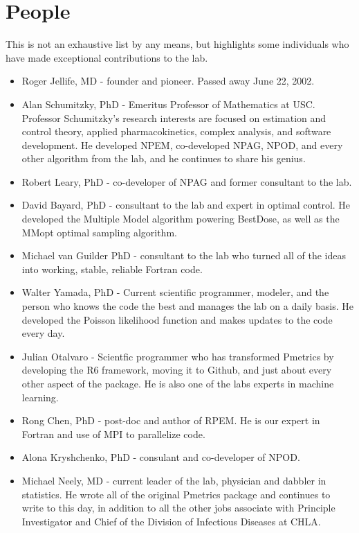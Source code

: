 \documentclass[
]{book}
\providecommand{\tightlist}{%
  \setlength{\itemsep}{0pt}\setlength{\parskip}{0pt}}
\begin{document}
\hypertarget{people}{%
\section{People}\label{people}}

This is not an exhaustive list by any means, but highlights some individuals who have made exceptional contributions to the lab.

\begin{itemize}
\tightlist
\item
  Roger Jellife, MD - founder and pioneer. Passed away June 22, 2002.
\item
  Alan Schumitzky, PhD - Emeritus Professor of Mathematics at USC. Professor Schumitzky's research interests are focused on estimation and control theory, applied pharmacokinetics, complex analysis, and software development. He developed NPEM, co-developed NPAG, NPOD, and every other algorithm from the lab, and he continues to share his genius.
\item
  Robert Leary, PhD - co-developer of NPAG and former consultant to the lab.
\item
  David Bayard, PhD - consultant to the lab and expert in optimal control. He developed the Multiple Model algorithm powering BestDose, as well as the MMopt optimal sampling algorithm.
\item
  Michael van Guilder PhD - consultant to the lab who turned all of the ideas into working, stable, reliable Fortran code.
\item
  Walter Yamada, PhD - Current scientific programmer, modeler, and the person who knows the code the best and manages the lab on a daily basis. He developed the Poisson likelihood function and makes updates to the code every day.
\item
  Julian Otalvaro - Scientfic programmer who has transformed Pmetrics by developing the R6 framework, moving it to Github, and just about every other aspect of the package. He is also one of the labs experts in machine learning.
\item
  Rong Chen, PhD - post-doc and author of RPEM. He is our expert in Fortran and use of MPI to parallelize code.
\item
  Alona Kryshchenko, PhD - consulant and co-developer of NPOD.
\item
  Michael Neely, MD - current leader of the lab, physician and dabbler in statistics. He wrote all of the original Pmetrics package and continues to write to this day, in addition to all the other jobs associate with Principle Investigator and Chief of the Division of Infectious Diseases at CHLA.
\end{itemize}
\end{document}
